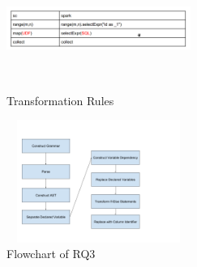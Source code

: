 \documentclass[sigplan]{acmart}\settopmatter{printfolios=true,printccs=false,printacmref=false}
\begin{document}
\begin{figure}[h]
	\includegraphics[width=6cm,height=4cm,keepaspectratio]{fig/t2.png}
	\caption{Transformation Rules}
	\label{fig:t2}
\end{figure}

\begin{figure}[h]
	\includegraphics[width=6cm,height=4cm,keepaspectratio]{fig/d.png}
	\caption{Flowchart of RQ3}
	\label{fig:d}
\end{figure}
\end{document}
